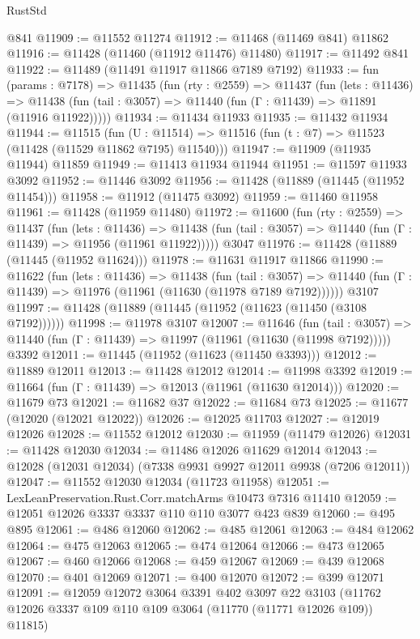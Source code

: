 \begin{lexlean}{RustStd}
\begin{coremodule}
    @841
@11909 := @11552 @11274
@11912 := @11468 (@11469 @841) @11862
@11916 := @11428 (@11460 (@11912 @11476) @11480)
@11917 := @11492 @841
@11922 := @11489 (@11491 @11917 @11866 @7189 @7192)
@11933 := fun (params : @7178) =>
  @11435
    (fun (rty : @2559) =>
    @11437
      (fun (lets : @11436) =>
      @11438 (fun (tail : @3057) => @11440 (fun (Γ : @11439) => @11891 (@11916 @11922)))))
@11934 := @11434 @11933
@11935 := @11432 @11934
@11944 := @11515
    (fun (U : @11514) => @11516 (fun (t : @7) => @11523 (@11428 (@11529 @11862 @7195) @11540)))
@11947 := @11909 (@11935 @11944) @11859
@11949 := @11413 @11934 @11944
@11951 := @11597 @11933 @3092
@11952 := @11446 @3092
@11956 := @11428 (@11889 (@11445 (@11952 @11454)))
@11958 := @11912 (@11475 @3092)
@11959 := @11460 @11958
@11961 := @11428 (@11959 @11480)
@11972 := @11600
    (fun (rty : @2559) =>
    @11437
      (fun (lets : @11436) =>
      @11438 (fun (tail : @3057) => @11440 (fun (Γ : @11439) => @11956 (@11961 @11922)))))
    @3047
@11976 := @11428 (@11889 (@11445 (@11952 @11624)))
@11978 := @11631 @11917 @11866
@11990 := @11622
    (fun (lets : @11436) =>
    @11438
      (fun (tail : @3057) =>
      @11440 (fun (Γ : @11439) => @11976 (@11961 (@11630 (@11978 @7189 @7192))))))
    @3107
@11997 := @11428 (@11889 (@11445 (@11952 (@11623 (@11450 (@3108 @7192))))))
@11998 := @11978 @3107
@12007 := @11646
    (fun (tail : @3057) => @11440 (fun (Γ : @11439) => @11997 (@11961 (@11630 (@11998 @7192)))))
    @3392
@12011 := @11445 (@11952 (@11623 (@11450 @3393)))
@12012 := @11889 @12011
@12013 := @11428 @12012
@12014 := @11998 @3392
@12019 := @11664 (fun (Γ : @11439) => @12013 (@11961 (@11630 @12014)))
@12020 := @11679 @73
@12021 := @11682 @37
@12022 := @11684 @73
@12025 := @11677 (@12020 (@12021 @12022))
@12026 := @12025 @11703
@12027 := @12019 @12026
@12028 := @11552 @12012
@12030 := @11959 (@11479 @12026)
@12031 := @11428 @12030
@12034 := @11486 @12026 @11629 @12014
@12043 := @12028 (@12031 @12034) (@7338 @9931 @9927 @12011 @9938 (@7206 @12011))
@12047 := @11552 @12030 @12034 (@11723 @11958)
@12051 := LexLeanPreservation.Rust.Corr.matchArms @10473 @7316 @11410
@12059 := @12051 @12026 @3337 @3337 @110 @110 @3077 @423 @839
@12060 := @495 @895
@12061 := @486 @12060
@12062 := @485 @12061
@12063 := @484 @12062
@12064 := @475 @12063
@12065 := @474 @12064
@12066 := @473 @12065
@12067 := @460 @12066
@12068 := @459 @12067
@12069 := @439 @12068
@12070 := @401 @12069
@12071 := @400 @12070
@12072 := @399 @12071
@12091 := @12059
    @12072
    @3064
    @3391
    @402
    @3097
    @22
    @3103
    (@11762 @12026 @3337 @109 @110 @109 @3064 (@11770 (@11771 @12026 @109)) @11815)

\end{coremodule}
\end{lexlean}

